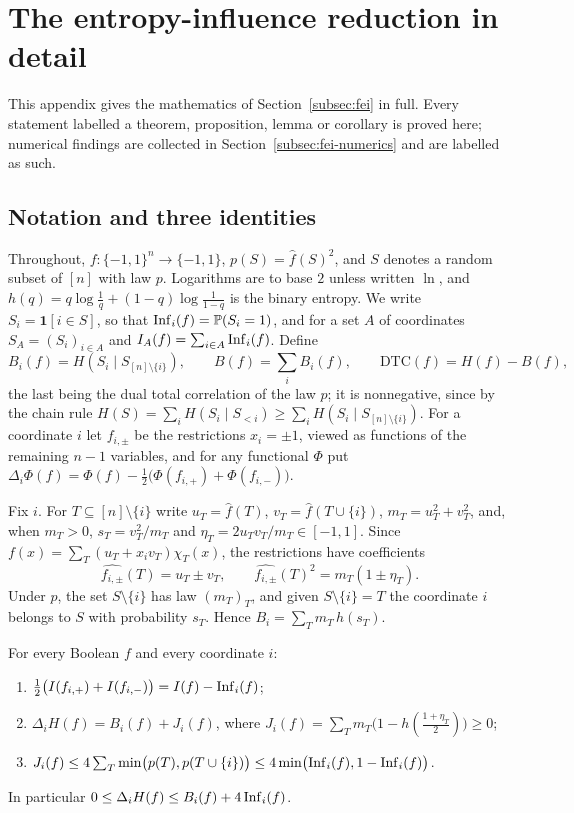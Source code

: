 \section{The entropy-influence reduction in detail}\label{app:fei}

This appendix gives the mathematics of Section~\ref{subsec:fei} in full. Every statement labelled a theorem, proposition, lemma or corollary is proved here; numerical findings are collected in Section~\ref{subsec:fei-numerics} and are labelled as such.

\subsection{Notation and three identities}
Throughout, $f:\{-1,1\}^n\to\{-1,1\}$, $p(S)=\hat f(S)^2$, and $S$ denotes a random subset of $[n]$ with law $p$. Logarithms are to base $2$ unless written $\ln$, and $h(q)=q\log\frac1q+(1-q)\log\frac1{1-q}$ is the binary entropy. We write $S_i=\mathbf 1[i\in S]$, so that $\operatorname{Inf}_i(f)=\mathbb{P}(S_i=1)$, and for a set $A$ of coordinates $S_A=(S_i)_{i\in A}$ and $I_A(f)=\sum_{i\in A}\operatorname{Inf}_i(f)$. Define
\[
B_i(f)=H(S_i\mid S_{[n]\setminus\{i\}}),\qquad B(f)=\sum_iB_i(f),\qquad \mathrm{DTC}(f)=H(f)-B(f),
\]
the last being the dual total correlation of the law $p$; it is nonnegative, since by the chain rule $H(S)=\sum_iH(S_i\mid S_{<i})\ge\sum_iH(S_i\mid S_{[n]\setminus\{i\}})$. For a coordinate $i$ let $f_{i,\pm}$ be the restrictions $x_i=\pm1$, viewed as functions of the remaining $n-1$ variables, and for any functional $\Phi$ put $\Delta_i\Phi(f)=\Phi(f)-\frac12\bigl(\Phi(f_{i,+})+\Phi(f_{i,-})\bigr)$.

Fix $i$. For $T\subseteq[n]\setminus\{i\}$ write $u_T=\hat f(T)$, $v_T=\hat f(T\cup\{i\})$, $m_T=u_T^2+v_T^2$, and, when $m_T>0$, $s_T=v_T^2/m_T$ and $\eta_T=2u_Tv_T/m_T\in[-1,1]$. Since $f(x)=\sum_T(u_T+x_iv_T)\chi_T(x)$, the restrictions have coefficients
\begin{equation}\label{eq:restr-coef}
\widehat{f_{i,\pm}}(T)=u_T\pm v_T,\qquad \widehat{f_{i,\pm}}(T)^2=m_T(1\pm\eta_T).
\end{equation}
Under $p$, the set $S\setminus\{i\}$ has law $(m_T)_T$, and given $S\setminus\{i\}=T$ the coordinate $i$ belongs to $S$ with probability $s_T$. Hence $B_i=\sum_Tm_T\,h(s_T)$.

\begin{lemma}\label{lem:restr}
For every Boolean $f$ and every coordinate $i$:
\begin{enumerate}[label=(\alph*)]
\item $\frac12\bigl(I(f_{i,+})+I(f_{i,-})\bigr)=I(f)-\operatorname{Inf}_i(f)$;
\item $\Delta_iH(f)=B_i(f)+J_i(f)$, where $J_i(f)=\sum_Tm_T\bigl(1-h(\tfrac{1+\eta_T}2)\bigr)\ge0$;
\item $J_i(f)\le4\sum_T\min\bigl(p(T),p(T\cup\{i\})\bigr)\le4\min\bigl(\operatorname{Inf}_i(f),1-\operatorname{Inf}_i(f)\bigr)$.
\end{enumerate}
In particular $0\le\Delta_iH(f)\le B_i(f)+4\operatorname{Inf}_i(f)$.
\end{lemma}

